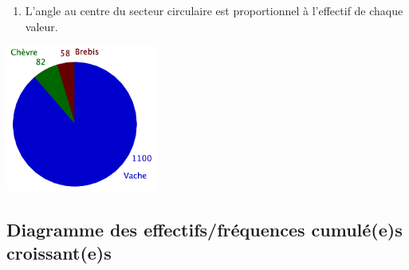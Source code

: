 \begin{multicols}{2}
  \begin{enumerate}
  \item L'angle au centre du secteur circulaire est proportionnel à l'effectif
    de chaque valeur.
  \end{enumerate}
  
  
  \columnbreak
  \begin{minipage}{1.0\linewidth}
    \vspace{-2em}
    \begin{center}
      \includegraphics[width=5cm]{Stats_Fig4_DiagCirc.png}
    \end{center}    
  \end{minipage}
\end{multicols}



\subsection{Diagramme des effectifs/fréquences cumulé(e)s croissant(e)s}

